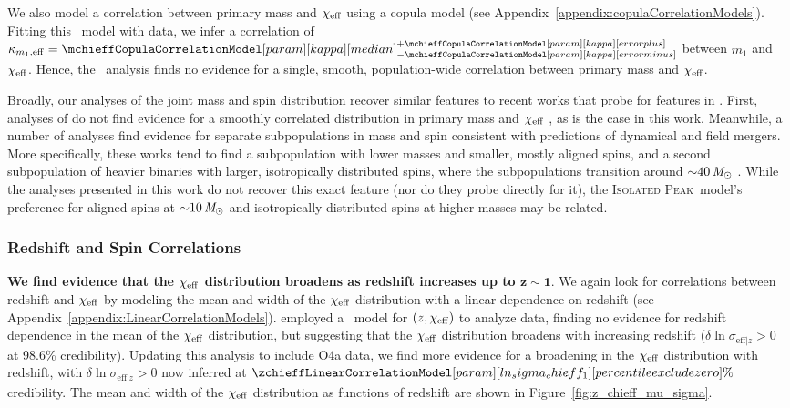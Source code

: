 We also model a correlation between primary mass and $\chi_{\rm eff}$ using a copula model (see Appendix~\ref{appendix:copulaCorrelationModels}).
Fitting this \copulacorrelation~model with \gwtcfour data, we infer a correlation of $\kappa_{m_1, \mathrm{eff}} = \CIPlusMinus{\mchieffCopulaCorrelationModel[param][kappa]}$ between $m_1$ and $\chi_{\rm eff}$.
Hence, the \copulacorrelation~analysis finds no evidence for a single, smooth, population-wide correlation between primary mass and $\chi_{\rm eff}$.

Broadly, our analyses of the joint mass and spin distribution recover similar features to recent works that probe for features in \gwtcthree.
First, analyses of \gwtcthree do not find evidence for a smoothly correlated distribution in primary mass and $\chi_{\rm eff}$ \citep{Safarzadeh:2020mlb, Biscoveanu:2022qac, Fishbach:2022lzq, Heinzel:2023hlb, Heinzel:2024hva, Antonini:2024het}, as is the case in this work.
Meanwhile, a number of analyses find evidence for separate subpopulations in mass and spin consistent with predictions of dynamical and field mergers.
More specifically, these works tend to find a subpopulation with lower masses and smaller, mostly aligned spins, and a second subpopulation of heavier binaries with larger, isotropically distributed spins, where the subpopulations transition around ${\sim} 40 \,\mathit{M_\odot}$ \citep{Wang:2022gnx, Mould:2022ccw, Godfrey:2023oxb, Li:2023yyt, Antonini:2024het, Pierra:2024fbl, Guo:2024wwv, Li:2025rhu, Sadiq:2025vly}.
While the analyses presented in this work do not recover this exact feature (nor do they probe directly for it), the \textsc{Isolated Peak}~model's preference for aligned spins at ${\sim} 10 \,\mathit{M_\odot}$ and isotropically distributed spins at higher masses may be related.

\subsubsection{Redshift and Spin Correlations}
\label{subsubsec:redshift_spin_correlations}
\textbf{We find evidence that the $\bm{\chieff}$ distribution broadens as redshift increases up to $\bm{z \sim 1}$}.
We again look for correlations between redshift and $\chi_{\rm eff}$ by modeling the mean and width of the $\chi_{\rm eff}$ distribution with a linear dependence on redshift (see Appendix~\ref{appendix:LinearCorrelationModels}).
\cite{Biscoveanu:2022qac} employed a \linearcorrelation~model for $(z,\chi_{\rm eff})$ to analyze \gwtcthree data, finding no evidence for redshift dependence in the mean of the $\chi_{\rm eff}$ distribution, but suggesting that the $\chi_{\rm eff}$ distribution broadens with increasing redshift ($\delta \ln \sigma_{\mathrm{eff}|z} > 0$ at 98.6\% credibility).
Updating this analysis to include \ac{O4a} data, we find more evidence for a broadening in the $\chi_{\rm eff}$ distribution with redshift, with $\delta \ln \sigma_{\mathrm{eff}|z} > 0$ now inferred at $\zchieffLinearCorrelationModel[param][ln_sigma_chieff_1][percentile exclude zero]\%$ credibility.
The mean and width of the $\chi_{\rm eff}$ distribution as functions of redshift are shown in Figure~\ref{fig:z_chieff_mu_sigma}.

